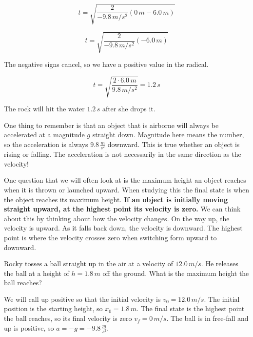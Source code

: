 \documentclass[12pt]{book}
\begin{document}
\begin{equation}
t = \sqrt{\frac{2}{-9.8 \, m/s^2} (0 \, m - 6.0 \, m)}
\end{equation}

\begin{equation}
t = \sqrt{\frac{2}{-9.8 \, m/s^2} (-6.0 \, m)}
\end{equation}

The negative signs cancel, so we have a positive value in the radical.

\begin{equation}
t = \sqrt{\frac{2 \cdot 6.0 \, m}{9.8 \, m/s^2}} = 1.2 \, s
\end{equation}

The rock will hit the water $1.2 \, s$ after she drops it.

\linespace

One thing to remember is that an object that is airborne will always be accelerated at a magnitude $g$ straight down. Magnitude here means the number, so the acceleration is always $9.8 \, \frac{m}{s^2}$ downward. This is true whether an object is rising or falling. The acceleration is not necessarily in the same direction as the velocity!

One question that we will often look at is the maximum height an object reaches when it is thrown or launched upward. When studying this the final state is when the object reaches its maximum height. \textbf{If an object is initially moving straight upward, at the highest point its velocity is zero.} We can think about this by thinking about how the velocity changes. On the way up, the velocity is upward. As it falls back down, the velocity is downward. The highest point is where the velocity crosses zero when switching form upward to downward.

\linespace

\example

Rocky tosses a ball straight up in the air at a velocity of $12.0 \, m/s$. He releases the ball at a height of $h = 1.8 \, m$ off the ground. What is the maximum height the ball reaches?

\hspace{10pt}

We will call up positive so that the initial velocity is $v_0 = 12.0 \, m/s$. The initial position is the starting height, so $x_0 = 1.8 \, m$. The final state is the highest point the ball reaches, so its final velocity is zero $v_f = 0 \, m/s$. The ball is in free-fall and up is positive, so $a = -g = -9.8 \, \frac{m}{s^2}$.
\end{document}

